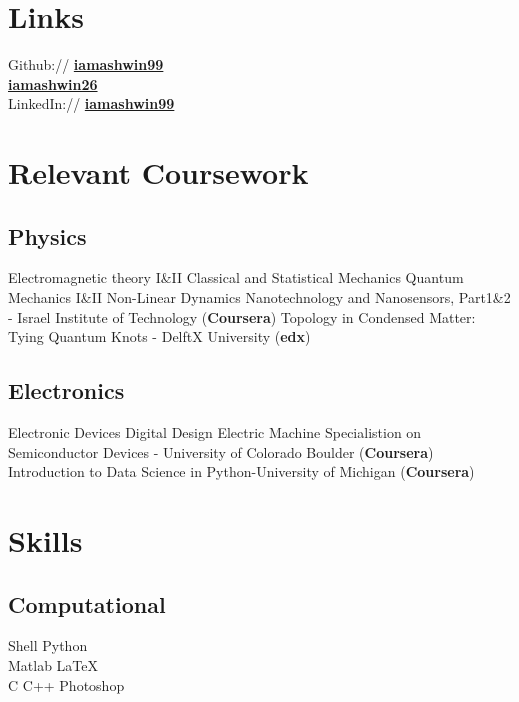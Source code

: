 \documentclass[]{deedy-resume-openfont}
\begin{document}
\begin{minipage}[t]{0.33\textwidth}

\section{Links}
Github:// \href{https://github.com/iamashwin99}{\bf iamashwin99} \\
 \qquad \qquad  \href{https://github.com/iamashwin26}{\bf iamashwin26} \\
LinkedIn://  \href{https://www.linkedin.com/in/iamashwin99}{\bf iamashwin99} \\




\section{Relevant Coursework}
\subsection{Physics}
\textbullet{} Electromagnetic theory I\&II \textbullet{} Classical and Statistical Mechanics \textbullet{} Quantum Mechanics I\&II  \textbullet{} Non-Linear Dynamics \textbullet{} Nanotechnology and Nanosensors, Part1\&2 -  Israel Institute of Technology (\textbf{Coursera}) \textbullet{}Topology in Condensed Matter: Tying Quantum Knots - DelftX University (\textbf{edx})   \textbullet{} 
\sectionsep

\subsection{Electronics}
\textbullet{} Electronic Devices \textbullet{} Digital Design \textbullet{} Electric Machine \textbullet{} Specialistion on Semiconductor Devices - University of Colorado Boulder (\textbf{Coursera})
\textbullet{}Introduction to Data Science in Python-University of Michigan (\textbf{Coursera}) 
\sectionsep

\section{Skills}
\subsection{Computational}
\textbullet{} Shell  \textbullet{} Python  \\
 \textbullet{} Matlab \textbullet{}  \LaTeX\ \\ 
\textbullet{}C \textbullet{} C++  \textbullet{} Photoshop \\
\sectionsep

%
%

\end{minipage} 
\end{document}
